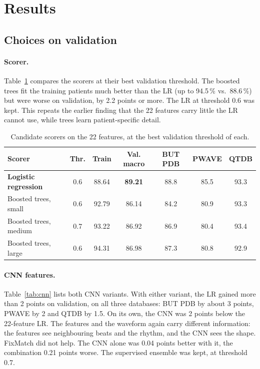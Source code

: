 \documentclass[11pt,a4paper]{article}
\begin{document}
\section{Results}

\subsection{Choices on validation}

\paragraph{Scorer.} Table~\ref{tab:scorer} compares the scorers at their best validation threshold. The boosted trees fit the training patients much better than the LR (up to 94.5\,\% vs.\ 88.6\,\%) but were worse on validation, by 2.2 points or more. The LR at threshold 0.6 was kept. This repeats the earlier finding that the 22 features carry little the LR cannot use, while trees learn patient-specific detail.

\begin{table}[ht]
\centering
\caption{Candidate scorers on the 22 features, at the best validation threshold of each.}
\label{tab:scorer}
\begin{tabular}{lcccccc}
\toprule
Scorer & Thr. & Train & Val. macro & BUT PDB & PWAVE & QTDB \\
\midrule
\textbf{Logistic regression} & 0.6 & 88.64 & \textbf{89.21} & 88.8 & 85.5 & 93.3 \\
Boosted trees, small & 0.6 & 92.79 & 86.14 & 84.2 & 80.9 & 93.3 \\
Boosted trees, medium & 0.7 & 93.22 & 86.92 & 86.9 & 80.4 & 93.4 \\
Boosted trees, large & 0.6 & 94.31 & 86.98 & 87.3 & 80.8 & 92.9 \\
\bottomrule
\end{tabular}
\end{table}

\paragraph{CNN features.} Table~\ref{tab:cnn} lists both CNN variants. With either variant, the LR gained more than 2 points on validation, on all three databases: BUT PDB by about 3 points, PWAVE by 2 and QTDB by 1.5. On its own, the CNN was 2 points below the 22-feature LR. The features and the waveform again carry different information: the features see neighbouring beats and the rhythm, and the CNN sees the shape. FixMatch did not help. The CNN alone was 0.04 points better with it, the combination 0.21 points worse. The supervised ensemble was kept, at threshold 0.7.
\end{document}

